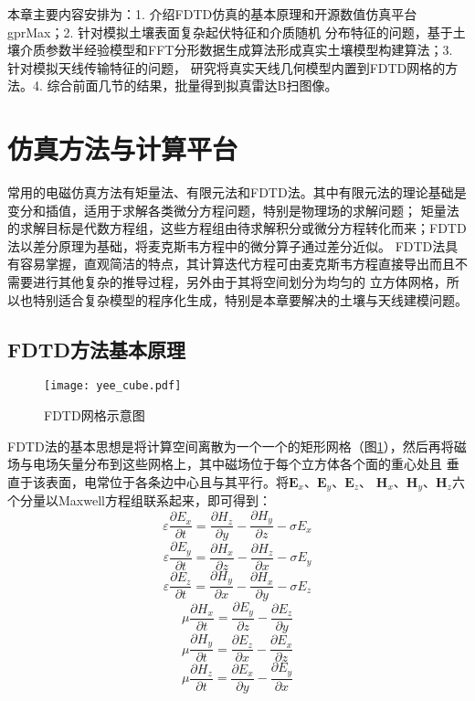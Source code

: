 本章主要内容安排为：1. 介绍FDTD仿真的基本原理和开源数值仿真平台gprMax；2. 针对模拟土壤表面复杂起伏特征和介质随机
分布特征的问题，基于土壤介质参数半经验模型和FFT分形数据生成算法形成真实土壤模型构建算法；3. 针对模拟天线传输特征的问题，
研究将真实天线几何模型内置到FDTD网格的方法。4. 综合前面几节的结果，批量得到拟真雷达B扫图像。
\section{仿真方法与计算平台}
常用的电磁仿真方法有矩量法、有限元法和FDTD法。其中有限元法的理论基础是变分和插值，适用于求解各类微分方程问题，特别是物理场的求解问题；
矩量法的求解目标是代数方程组，这些方程组由待求解积分或微分方程转化而来；FDTD法以差分原理为基础，将麦克斯韦方程中的微分算子通过差分近似。
FDTD法具有容易掌握，直观简洁的特点，其计算迭代方程可由麦克斯韦方程直接导出而且不需要进行其他复杂的推导过程，另外由于其将空间划分为均匀的
立方体网格，所以也特别适合复杂模型的程序化生成，特别是本章要解决的土壤与天线建模问题。
\subsection{FDTD方法基本原理}
\begin{figure}[htbp]
	\texttt{[image: yee\_cube.pdf]}
	\caption{FDTD网格示意图}
	\label{yee_cube}
\end{figure}

FDTD法的基本思想是将计算空间离散为一个一个的矩形网格（图\ref{yee_cube}），然后再将磁场与电场矢量分布到这些网格上，其中磁场位于每个立方体各个面的重心处且
垂直于该表面，电常位于各条边中心且与其平行。将$\mathbf{E}_x$、$\mathbf{E}_y$、$\mathbf{E}_z$、
$\mathbf{H}_x$、$\mathbf{H}_y$、$\mathbf{H}_z$六个分量以Maxwell方程组联系起来，即可得到：
\begin{equation} 
\varepsilon \frac{\partial E_{x}}{\partial t}=\frac{\partial H_{z}}{\partial y}-\frac{\partial H_{y}}{\partial z}-\sigma E_{x}
\label{eqn:maxwell_1} 
\end{equation}
 \begin{equation} 
 \varepsilon \frac{\partial E_{y}}{\partial t}=\frac{\partial H_{x}}{\partial z}-\frac{\partial H_{z}}{\partial x}-\sigma E_{y}
  \end{equation}
  \begin{equation} 
  \varepsilon \frac{\partial E_{z}}{\partial t}=\frac{\partial H_{y}}{\partial x}-\frac{\partial H_{x}}{\partial y}-\sigma E_{z}
   \end{equation}
   \begin{equation} 
\mu \frac{\partial H_{x}}{\partial t}=\frac{\partial E_{y}}{\partial z}-\frac{\partial E_{z}}{\partial y}
 \end{equation}
 \begin{equation} 
\mu \frac{\partial H_{y}}{\partial t}=\frac{\partial E_{z}}{\partial x}-\frac{\partial E_{x}}{\partial z}
 \end{equation}
 \begin{equation} 
	\label{eqn:maxwell_6}
\mu \frac{\partial H_{z}}{\partial t}=\frac{\partial E_{x}}{\partial y}-\frac{\partial E_{y}}{\partial x}
 \end{equation}

